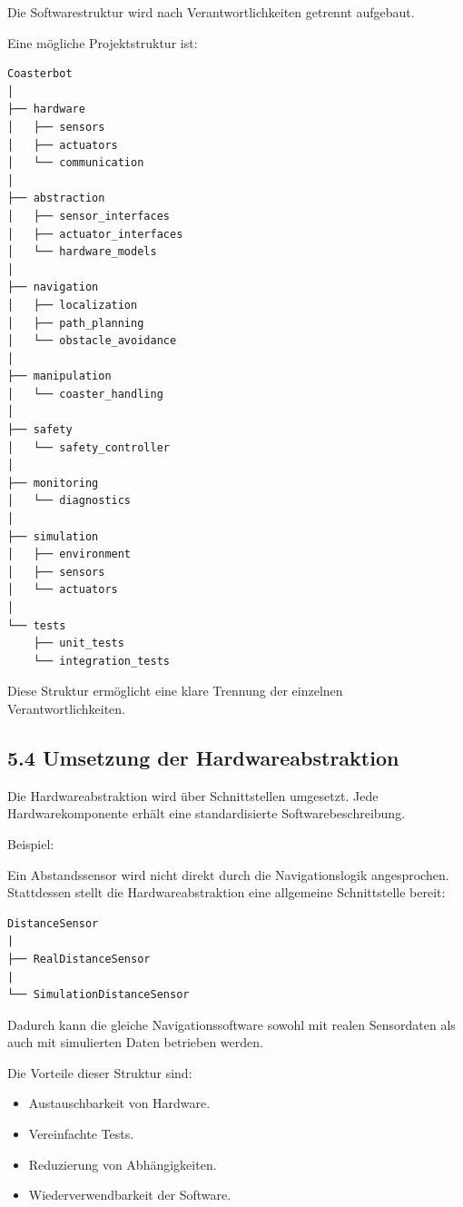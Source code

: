 \documentclass[
]{article}
\providecommand{\tightlist}{%
  \setlength{\itemsep}{0pt}\setlength{\parskip}{0pt}}
\begin{document}
Die Softwarestruktur wird nach Verantwortlichkeiten getrennt aufgebaut.

Eine mögliche Projektstruktur ist:

\begin{verbatim}
Coasterbot
│
├── hardware
│   ├── sensors
│   ├── actuators
│   └── communication
│
├── abstraction
│   ├── sensor_interfaces
│   ├── actuator_interfaces
│   └── hardware_models
│
├── navigation
│   ├── localization
│   ├── path_planning
│   └── obstacle_avoidance
│
├── manipulation
│   └── coaster_handling
│
├── safety
│   └── safety_controller
│
├── monitoring
│   └── diagnostics
│
├── simulation
│   ├── environment
│   ├── sensors
│   └── actuators
│
└── tests
    ├── unit_tests
    └── integration_tests
\end{verbatim}

Diese Struktur ermöglicht eine klare Trennung der einzelnen
Verantwortlichkeiten.

\subsection{5.4 Umsetzung der
Hardwareabstraktion}\label{umsetzung-der-hardwareabstraktion}

Die Hardwareabstraktion wird über Schnittstellen umgesetzt. Jede
Hardwarekomponente erhält eine standardisierte Softwarebeschreibung.

Beispiel:

Ein Abstandssensor wird nicht direkt durch die Navigationslogik
angesprochen. Stattdessen stellt die Hardwareabstraktion eine allgemeine
Schnittstelle bereit:

\begin{verbatim}
DistanceSensor
|
├── RealDistanceSensor
|
└── SimulationDistanceSensor
\end{verbatim}

Dadurch kann die gleiche Navigationssoftware sowohl mit realen
Sensordaten als auch mit simulierten Daten betrieben werden.

Die Vorteile dieser Struktur sind:

\begin{itemize}
\tightlist
\item
  Austauschbarkeit von Hardware.
\item
  Vereinfachte Tests.
\item
  Reduzierung von Abhängigkeiten.
\item
  Wiederverwendbarkeit der Software.
\end{itemize}
\end{document}
